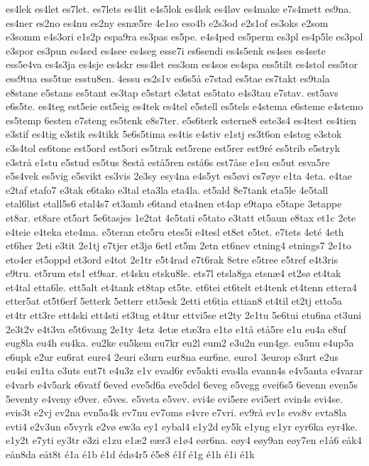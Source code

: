 {es4lek
es4let
es7let.
es7lets
es4lit
e4s5lok
es4løk
es4løv
es4make
e7s4mett
es9na.
es4ner
es2no
es4nu
es2ny
esnæ5re
4e1so
eso4b
e2s3od
e2s1of
es3oks
e2som
e3somm
e4s3ori
e1s2p
espa9ra
es3pas
es5pe.
e4s4ped
es5perm
es3pl
es4p5le
es3pol
e3spor
es3pun
es4sed
es4see
es4seg
esse7i
es6sendi
es4s5enk
es4ses
es4sete
ess5e4va
es4s3ja
es4sje
es4skr
ess4let
ess3om
es4sos
es4spa
ess5tilt
es4stol
ess5tor
ess9tua
ess5tue
esstu8en.
4essu
es2s1v
es6s5å
e7stad
es5tae
es7takt
es9tala
e8stane
e5stans
es5tant
es3tap
e5start
e3stat
es5tato
e4s3tau
e7stav.
est5avs
e6s5te.
es4teg
est5eie
est5eig
es4tek
es4tel
e5stell
es5tels
e4stema
e6steme
e4stemo
es5temp
6esten
e7steng
es5tenk
e8s7ter.
e5s6terk
esterne8
este3s4
es4test
es4tien
e3stif
es4tig
e3stik
es4tikk
5e6s5tima
es4tis
e4stiv
e1stj
es3t6on
e4stog
e3stok
e3s4tol
es6tone
est5ord
est5ori
es5trak
est5rene
est5rer
est9ré
es5trib
e5stryk
e3strå
e1stu
e5stud
es5tus
8estå
estå5ren
estå6s
est7åse
e1su
es5ut
esva5re
e5s4vek
es5vig
e5svikt
es3vis
2e3sy
esy4na
e4s5yt
es5øvi
es7øye
e1ta
4eta.
e4tae
e2taf
etafo7
e3tak
e6tako
e3tal
eta3la
eta4la.
et5ald
8e7tank
eta5le
4e5tall
etal6list
etall5s6
etal4s7
et3amb
e6tand
eta4nen
et4ap
e9tapa
e5tape
3etappe
et8ar.
et8are
et5art
5e6tasjes
1e2tat
4e5tati
e5tato
e3tatt
et5aun
e8tax
et1c
2ete
e4teie
e4teka
ete4ma.
e5teran
ete5ru
etes5i
e4tesl
et8et
e5tet.
e7tets
4eté
4eth
et6her
2eti
e3tit
2e1tj
e7tjer
et3jø
6etl
et5m
2etn
et6nev
etning4
etnings7
2e1to
eto4er
et5oppd
et3ord
e4tot
2e1tr
e5t4rad
e7t6rak
8etre
e5tree
e5tref
e4t3ris
e9tru.
et5rum
ets1
et9sar.
et4sku
etsku8le.
ets7l
etsla8ga
etsnæ4
et2sø
et4tak
et4tal
etta6le.
ett5alt
et4tank
et8tap
et5te.
et6tei
et6telt
et4tenk
et4tenn
ettera4
etter5at
et5t6erf
5etterk
5etterr
ett5esk
2etti
et6tia
ettian8
et4til
et2tj
etto5a
et4tr
ett3re
ett4ski
ett4sti
et3tug
et4tur
ettvi5se
et2ty
2e1tu
5e6tui
etu6na
et3uni
2e3t2v
e4t3va
e5t6vang
2e1ty
4etz
4etæ
etæ3ra
e1tø
e1tå
etå5re
e1u
eu4a
e8uf
eug8la
eu4h
eu4ka.
eu2ke
eu5kem
eu7kr
eu2l
eum2
e3u2n
eun4ge.
eu5nu
e4up5a
e6upk
e2ur
eu6rat
eure4
2euri
e3urn
eur8na
eur6ne.
euro1
3europ
e3urt
e2us
eu4si
eu1ta
e3uts
eut7t
e4u3z
e1v
evad6r
ev5akti
eva4la
evann4s
e4v5anta
e4varar
e4varb
e4v5ark
e6vatf
6eved
eve5d6a
eve5del
6eveg
e5vegg
evei6s5
6evenn
even5s
5eventy
e4veny
e9ver.
e5ves.
e5veta
e5vev.
evi4e
evi5ere
evi5ert
evin4s
evi4se.
evis3t
e2vj
ev2na
evn5a4k
ev7nu
ev7oms
e4vre
e7vri.
ev9rå
ev1s
evs8v
evta8la
evti4
e2v3un
e5vyrk
e2vø
ew3a
ey1
eybal4
e1y2d
ey5k
e1yng
e1yr
eyr6ka
eyr4ke.
e1y2t
e7yti
ey3tr
e3zi
e1zu
e1æ2
eær3
e1ø4
eør6na.
eøy4
eøy9an
eøy7en
e1å6
eåk4
eån8da
eåt8t
é1a
é1b
é1d
édø4r5
é5e8
é1f
é1g
é1h
é1i
é1k
}
